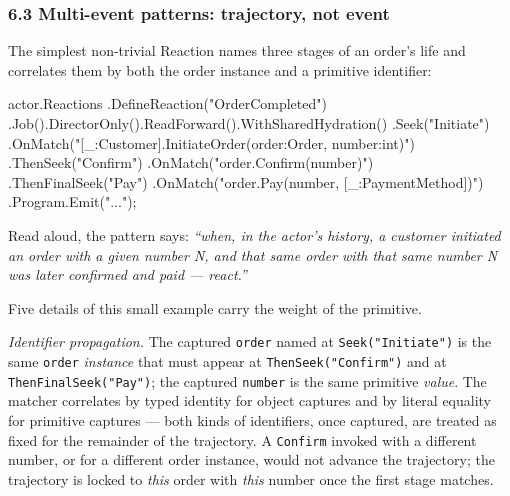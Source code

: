 \documentclass[
]{article}
\newenvironment{Shaded}{}{}
\newcommand{\FunctionTok}[1]{\textcolor[rgb]{0.02,0.16,0.49}{#1}}
\newcommand{\NormalTok}[1]{#1}
\newcommand{\OperatorTok}[1]{\textcolor[rgb]{0.40,0.40,0.40}{#1}}
\newcommand{\StringTok}[1]{\textcolor[rgb]{0.25,0.44,0.63}{#1}}
\let\origtexttt\texttt%
\renewcommand{\texttt}[1]{\origtexttt{\seqsplit{#1}}}%
\let\texttt\origtexttt%
\begin{document}
\subsubsection{6.3 Multi-event patterns: trajectory, not
event}\label{multi-event-patterns-trajectory-not-event}

The simplest non-trivial Reaction names three stages of an order's life
and correlates them by both the order instance and a primitive
identifier:

\begin{Shaded}
\begin{Highlighting}[]
\NormalTok{actor}\OperatorTok{.}\FunctionTok{Reactions}
    \OperatorTok{.}\FunctionTok{DefineReaction}\OperatorTok{(}\StringTok{"OrderCompleted"}\OperatorTok{)}
    \OperatorTok{.}\FunctionTok{Job}\OperatorTok{().}\FunctionTok{DirectorOnly}\OperatorTok{().}\FunctionTok{ReadForward}\OperatorTok{().}\FunctionTok{WithSharedHydration}\OperatorTok{()}
    \OperatorTok{.}\FunctionTok{Seek}\OperatorTok{(}\StringTok{"Initiate"}\OperatorTok{)}
        \OperatorTok{.}\FunctionTok{OnMatch}\OperatorTok{(}\StringTok{"[\_:Customer].InitiateOrder(order:Order, number:int)"}\OperatorTok{)}
    \OperatorTok{.}\FunctionTok{ThenSeek}\OperatorTok{(}\StringTok{"Confirm"}\OperatorTok{)}
        \OperatorTok{.}\FunctionTok{OnMatch}\OperatorTok{(}\StringTok{"order.Confirm(number)"}\OperatorTok{)}
    \OperatorTok{.}\FunctionTok{ThenFinalSeek}\OperatorTok{(}\StringTok{"Pay"}\OperatorTok{)}
        \OperatorTok{.}\FunctionTok{OnMatch}\OperatorTok{(}\StringTok{"order.Pay(number, [\_:PaymentMethod])"}\OperatorTok{)}
    \OperatorTok{.}\FunctionTok{Program}\OperatorTok{.}\FunctionTok{Emit}\OperatorTok{(}\StringTok{"..."}\OperatorTok{);}
\end{Highlighting}
\end{Shaded}

Read aloud, the pattern says: \emph{``when, in the actor's history, a
customer initiated an order with a given number N, and that same order
with that same number N was later confirmed and paid --- react.''}

Five details of this small example carry the weight of the primitive.

\emph{Identifier propagation.} The captured \texttt{order} named at
\texttt{Seek("Initiate")} is the same \texttt{order} \emph{instance}
that must appear at \texttt{ThenSeek("Confirm")} and at
\texttt{ThenFinalSeek("Pay")}; the captured \texttt{number} is the same
primitive \emph{value}. The matcher correlates by typed identity for
object captures and by literal equality for primitive captures --- both
kinds of identifiers, once captured, are treated as fixed for the
remainder of the trajectory. A \texttt{Confirm} invoked with a different
number, or for a different order instance, would not advance the
trajectory; the trajectory is locked to \emph{this} order with
\emph{this} number once the first stage matches.
\end{document}
